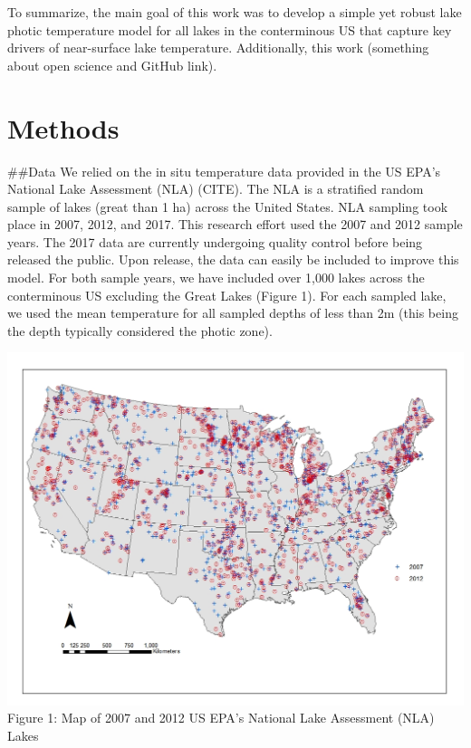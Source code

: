 \documentclass[
]{article}
\begin{document}
To summarize, the main goal of this work was to develop a simple yet
robust lake photic temperature model for all lakes in the conterminous
US that capture key drivers of near-surface lake temperature.
Additionally, this work (something about open science and GitHub link).

\hypertarget{methods}{%
\section{Methods}\label{methods}}

\#\#Data We relied on the in situ temperature data provided in the US
EPA's National Lake Assessment (NLA) (CITE). The NLA is a stratified
random sample of lakes (great than 1 ha) across the United States. NLA
sampling took place in 2007, 2012, and 2017. This research effort used
the 2007 and 2012 sample years. The 2017 data are currently undergoing
quality control before being released the public. Upon release, the data
can easily be included to improve this model. For both sample years, we
have included over 1,000 lakes across the conterminous US excluding the
Great Lakes (Figure 1). For each sampled lake, we used the mean
temperature for all sampled depths of less than 2m (this being the depth
typically considered the photic zone).

\includegraphics{../figures/LakePhoticZonev2.jpg} Figure 1: Map of 2007
and 2012 US EPA's National Lake Assessment (NLA) Lakes
\end{document}

